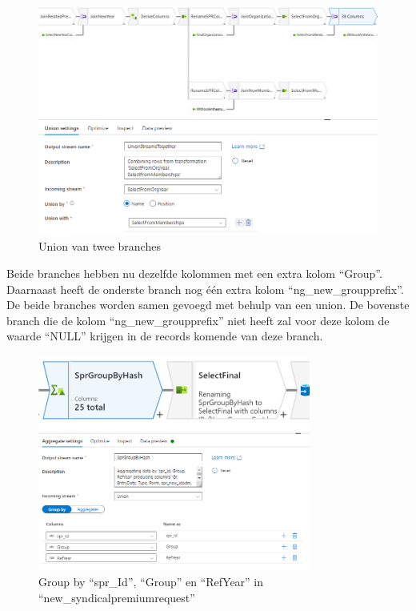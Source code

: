 \begin{figure}[H]
    \centering
    \includegraphics[width=1\textwidth]{./graphics/adf/bepalen_groep_9.png}
    \caption{Union van twee branches}
\end{figure}

Beide branches hebben nu dezelfde kolommen met een extra kolom ``Group''. Daarnaast heeft de onderste branch nog één extra kolom ``ng\_new\_groupprefix''. De beide branches worden samen gevoegd met behulp van een union. De bovenste branch die de kolom ``ng\_new\_groupprefix'' niet heeft zal voor deze kolom de waarde ``NULL'' krijgen in de records komende van deze branch. 

\begin{figure}[H]
    \centering
    \includegraphics[width=0.8\textwidth]{./graphics/adf/group_by_1.png}
    \caption{Group by ``spr\_Id'', ``Group'' en ``RefYear'' in ``new\_syndicalpremiumrequest''}
    \label{fig:groupby}
\end{figure}

